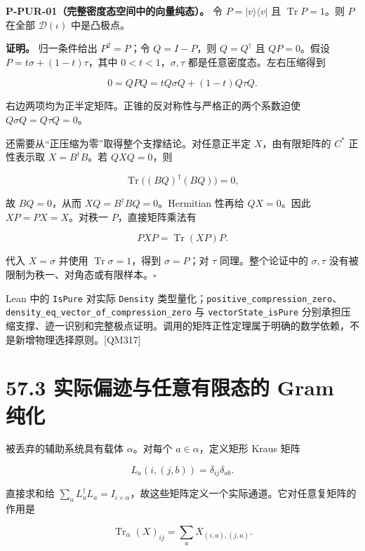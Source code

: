 \documentclass[
  11pt,
  oneside]{book}
\begin{document}
\protect\hypertarget{p-pur-01}{}{}

\textbf{P-PUR-01（完整密度态空间中的向量纯态）。} 令
\(P=|v\rangle\langle v|\) 且 \(\operatorname{Tr}P=1\)。则 \(P\) 在全部
\(\mathcal D(\iota)\) 中是凸极点。

\textbf{证明。} 归一条件给出 \(P^2=P\)；令 \(Q=I-P\)，则 \(Q=Q^\dagger\)
且 \(QP=0\)。假设 \(P=t\sigma+(1-t)\tau\)，其中
\(0<t<1\)，\(\sigma,\tau\) 都是任意密度态。左右压缩得到

\[
0=QPQ=tQ\sigma Q+(1-t)Q\tau Q.
\]

右边两项均为正半定矩阵。正锥的反对称性与严格正的两个系数迫使
\(Q\sigma Q=Q\tau Q=0\)。

还需要从``正压缩为零''取得整个支撑结论。对任意正半定 \(X\)，由有限矩阵的
\(C^*\) 正性表示取 \(X=B^\dagger B\)。若 \(QXQ=0\)，则

\[
\operatorname{Tr}\bigl((BQ)^\dagger(BQ)\bigr)=0,
\]

故 \(BQ=0\)，从而 \(XQ=B^\dagger BQ=0\)。Hermitian 性再给 \(QX=0\)。因此
\(XP=PX=X\)。对秩一 \(P\)，直接矩阵乘法有

\[
PXP=\operatorname{Tr}(XP)P.
\]

代入 \(X=\sigma\) 并使用 \(\operatorname{Tr}\sigma=1\)，得到
\(\sigma=P\)；对 \(\tau\) 同理。整个论证中的 \(\sigma,\tau\)
没有被限制为秩一、对角态或有限样本。\(\square\)

Lean 中的 \texttt{Is\allowbreak Pure} 对实际 \texttt{Density}
类型量化；\texttt{positive\_\allowbreak compression\_\allowbreak zero}、\allowbreak \texttt{density\_\allowbreak eq\_\allowbreak vector\_\allowbreak of\_\allowbreak compression\_\allowbreak zero}
与 \texttt{vector\allowbreak State\_\allowbreak is\allowbreak Pure}
分别承担压缩支撑、迹一识别和完整极点证明。调用的矩阵正性定理属于明确的数学依赖，不是新增物理选择原则。{[}QM317{]}

\section{57.3 实际偏迹与任意有限态的 Gram 纯化}

被丢弃的辅助系统具有载体 \(\alpha\)。对每个 \(a\in\alpha\)，定义矩形
Kraus 矩阵

\[
L_a(i,(j,b))=\delta_{ij}\delta_{ab}.
\]

直接求和给
\(\sum_aL_a^\dagger L_a=I_{\iota\times\alpha}\)，故这些矩阵定义一个实际通道。它对任意复矩阵的作用是

\[
\operatorname{Tr}_{\alpha}(X)_{ij}
=\sum_aX_{(i,a),(j,a)}.
\]
\end{document}
